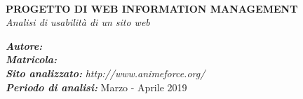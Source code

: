 \begin{titlepage}
	\HRule \\[0.4cm]
	{ \huge \bfseries PROGETTO DI WEB INFORMATION MANAGEMENT}\\[0.6cm] %
	{ \huge \emph{Analisi di usabilità di un sito web} }
	\HRule \\[1cm]
	
	
	\vspace{1cm}
	
	\begin{minipage}{0.5\textwidth}
		\begin{flushleft} 
			\center
			\emph{\bfseries Autore: }\nomeStudente\ \cognomeStudente\ \\
			\emph{\bfseries Matricola: }\matricolaStudente \\
			\emph{\bfseries Sito analizzato: } \textit{http://www.animeforce.org/} \\
			\emph{\bfseries Periodo di analisi: } Marzo - Aprile 2019
		\end{flushleft}
	\end{minipage}
	
\end{titlepage}

\tableofcontents
\newpage
